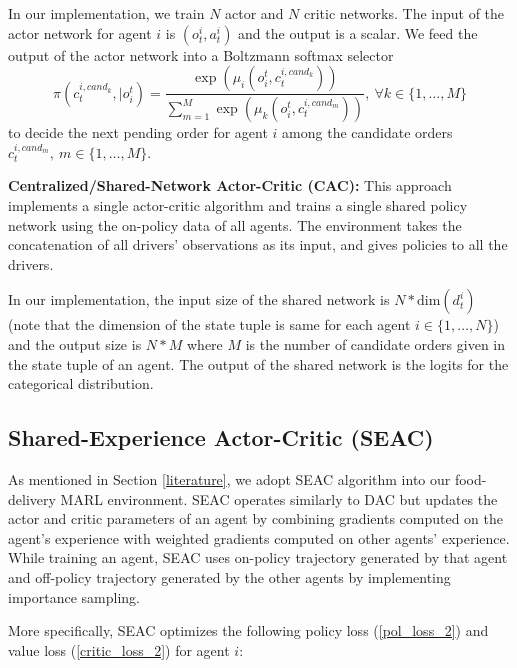 \documentclass{article}
\theoremstyle{defn}
\theoremstyle{prop}
\theoremstyle{assm}
\theoremstyle{theoremm}
\theoremstyle{remarkk}
\theoremstyle{lem}
\theoremstyle{example}
\theoremstyle{example}
\begin{document}
In our implementation, we train $N$ actor and $N$ critic networks. The input of the actor network for agent $i$ is $(o_t^i,a_t^i)$ and the output is a scalar. We feed the output of the actor network into a Boltzmann softmax selector
\begin{equation}
\pi(c_t^{i,cand_k},|o^t_i)= \frac{\exp(\mu_i(o^t_i,c_t^{i,cand_k}))}{\sum\limits_{m=1}^{M} \exp(\mu_k(o^t_i,c_t^{i,cand_m}))}, \ \forall k \in \{1, \ldots, M\}
\end{equation} to decide the next pending order for agent $i$ among the candidate orders $c_t^{i,cand_m}, \ m \in \{1, \ldots, M\}$. 

\textbf{Centralized/Shared-Network Actor-Critic (CAC):} This approach implements a single actor-critic algorithm and trains a single shared policy network using the on-policy data of all agents. The environment takes the concatenation of all drivers' observations as its input, and gives policies to all the drivers.

In our implementation, the input size of the shared network is  $N *\text{dim}(d^i_t)$ (note that the dimension of the state tuple is same for each agent $i \in \{1, \ldots, N\}$) and the output size is $N*M$ where $M$ is the number of candidate orders given in the state tuple of an agent. The output of the shared network is the logits for the categorical distribution. 
\subsection{Shared-Experience Actor-Critic (SEAC)}\label{seac}
As mentioned in Section \ref{literature}, we adopt SEAC \citep[see][]{christianos2020shared} algorithm into our food-delivery MARL environment. SEAC operates similarly to DAC but updates the actor and critic parameters of an agent by combining gradients computed on the agent’s experience with weighted gradients computed on other agents’ experience. While training an agent, SEAC uses on-policy trajectory generated by that agent and off-policy trajectory generated by the other agents by implementing importance sampling. 

More specifically, SEAC optimizes the following policy loss (\ref{pol_loss_2}) and value loss (\ref{critic_loss_2}) for agent $i$:
\end{document}
